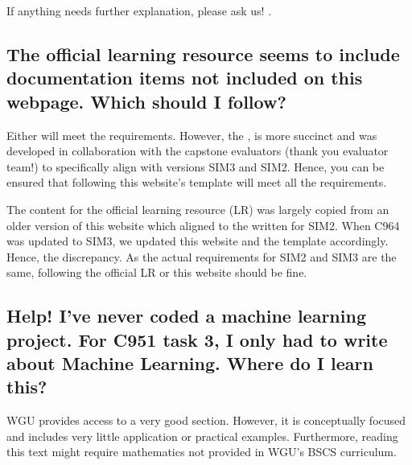 \documentclass[letterpaper,10pt,english]{jupyterBook}
\begin{document}
\sphinxAtStartPar
If anything needs further explanation, please ask us! .


\subsection{The official learning resource seems to include documentation items not included on this webpage. Which should I follow?}
\label{\detokenize{task2_c/task2_part_c:the-official-learning-resource-seems-to-include-documentation-items-not-included-on-this-webpage-which-should-i-follow}}
\sphinxAtStartPar
Either will meet the requirements. However, the , is more succinct and was developed in collaboration with the capstone evaluators (thank you evaluator team!) to specifically align with versions SIM3 and SIM2. Hence, you can be ensured that following this website’s template will meet all the requirements.

\sphinxAtStartPar
The content for the official learning resource (LR) was largely copied from an older version of this website which aligned to the  written for SIM2. When C964 was updated to SIM3, we updated this website and the template accordingly. Hence, the discrepancy. As the actual requirements for SIM2 and SIM3 are the same, following the official LR or this website should be fine.


\subsection{Help! I’ve never coded a machine learning project. For C951 task 3, I only had to write about Machine Learning. Where do I learn this?}
\label{\detokenize{task2_c/task2_part_c:help-i-ve-never-coded-a-machine-learning-project-for-c951-task-3-i-only-had-to-write-about-machine-learning-where-do-i-learn-this}}
\sphinxAtStartPar
WGU provides access to a very good  section. However, it is conceptually focused and includes very little application or practical examples. Furthermore, reading this text might require mathematics not provided in WGU’s BSCS curriculum.
\end{document}
